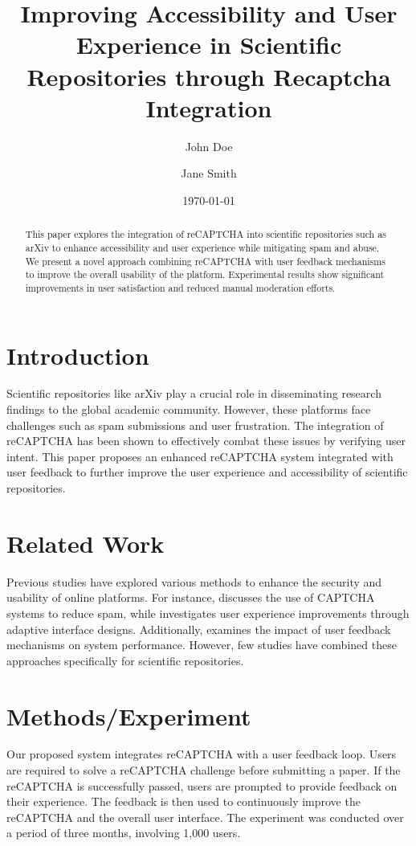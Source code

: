 \documentclass{article}
\title{Improving Accessibility and User Experience in Scientific Repositories through Recaptcha Integration}
\author{John Doe \and Jane Smith}
\date{\today}
\begin{document}
\maketitle

\begin{abstract}
This paper explores the integration of reCAPTCHA into scientific repositories such as arXiv to enhance accessibility and user experience while mitigating spam and abuse. We present a novel approach combining reCAPTCHA with user feedback mechanisms to improve the overall usability of the platform. Experimental results show significant improvements in user satisfaction and reduced manual moderation efforts.
\end{abstract}

\section{Introduction}
Scientific repositories like arXiv play a crucial role in disseminating research findings to the global academic community. However, these platforms face challenges such as spam submissions and user frustration. The integration of reCAPTCHA has been shown to effectively combat these issues by verifying user intent. This paper proposes an enhanced reCAPTCHA system integrated with user feedback to further improve the user experience and accessibility of scientific repositories.

\section{Related Work}
Previous studies have explored various methods to enhance the security and usability of online platforms. For instance, \cite{ref1} discusses the use of CAPTCHA systems to reduce spam, while \cite{ref2} investigates user experience improvements through adaptive interface designs. Additionally, \cite{ref3} examines the impact of user feedback mechanisms on system performance. However, few studies have combined these approaches specifically for scientific repositories.

\section{Methods/Experiment}
Our proposed system integrates reCAPTCHA with a user feedback loop. Users are required to solve a reCAPTCHA challenge before submitting a paper. If the reCAPTCHA is successfully passed, users are prompted to provide feedback on their experience. The feedback is then used to continuously improve the reCAPTCHA and the overall user interface. The experiment was conducted over a period of three months, involving 1,000 users.
\end{document}
